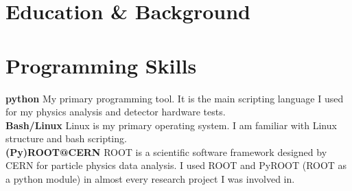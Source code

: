 \documentclass[10pt]{article} %
\begin{document}

\section{Education \& Background}




\section{Programming Skills}
\textbf{python}
\small{
My primary programming tool. It is the main scripting language I used for my physics analysis and detector hardware tests.
}\\

\textbf{Bash/Linux}
\small{
Linux is my primary operating system. I am familiar with Linux structure and bash scripting.
}\\

\textbf{(Py)ROOT@CERN}
\small{
ROOT is a scientific software framework designed by CERN for particle physics data analysis. I used ROOT and PyROOT (ROOT as a python module) in almost every research project I was involved in.
}\\
\end{document}
